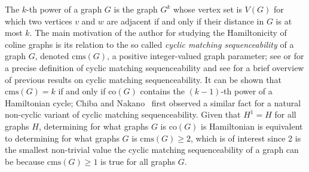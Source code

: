 \documentclass[12pt]{article}
\theoremstyle{definition}
\newcommand{\cms}{\text{cms}}
\newcommand{\co}{\text{co}}
\begin{document}
The $k$-th power of a graph $G$ is the graph $G^k$ whose vertex set is $V(G)$ for which two vertices $v$ and $w$ are adjacent if and only if their distance in $G$ is at most $k$. 
The main motivation of the author for studying the Hamiltonicity of coline graphs is its relation to the so called {\em cyclic matching sequenceability} of a graph $G$, denoted $\cms(G)$, a positive integer-valued graph parameter;
see \cite{BrKiMeSc12} or \cite{HoMa21}  for a precise definition of cyclic matching sequenceability and see \cite{HoMa21}  for a brief overview of previous results on cyclic matching sequenceability. 
It can be shown that $\cms(G) = k$ if and only if $\co(G)$ contains the $(k-1)$-th power of a Hamiltonian cycle;
Chiba and Nakano~\cite{ChNa16} first observed a similar fact for a natural non-cyclic variant of cyclic matching sequenceability. Given that $H^1 =H$ for all graphs $H$, determining for what graphs $G$ is  $\co(G)$ is Hamiltonian is equivalent to determining for what graphs $G$ is $\cms(G)\geq 2$, which is of interest since 2 is the smallest non-trivial value the cyclic matching sequenceability of a graph can be because $\cms(G) \geq 1$ is true for all graphs $G$.
\end{document}
